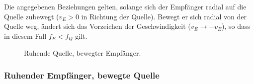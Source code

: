 \documentclass[
	german,%
	accentcolor=3d,%
	type=intern, %
	marginpar=false,%
]{tudapub}
\begin{document}
      Die angegebenen Beziehungen gelten, solange sich der Empfänger radial auf die Quelle zubewegt (\(v_E > 0\) in Richtung der Quelle). Bewegt er sich radial von der Quelle weg, ändert sich das Vorzeichen der Geschwindigkeit (\(v_E \rightarrow -v_E\)), so dass in diesem Fall \(f_E < f_Q\) gilt.

      \begin{figure}[htbp]
         \centering
         \caption{Ruhende Quelle, bewegter Empfänger.}\label{fig:bewegter-empfaenger-ruhende-quelle}
      \end{figure}

   \subsubsection{Ruhender Empfänger, bewegte Quelle}\label{sec:doppler-ruhender-empfaenger}
\end{document}
